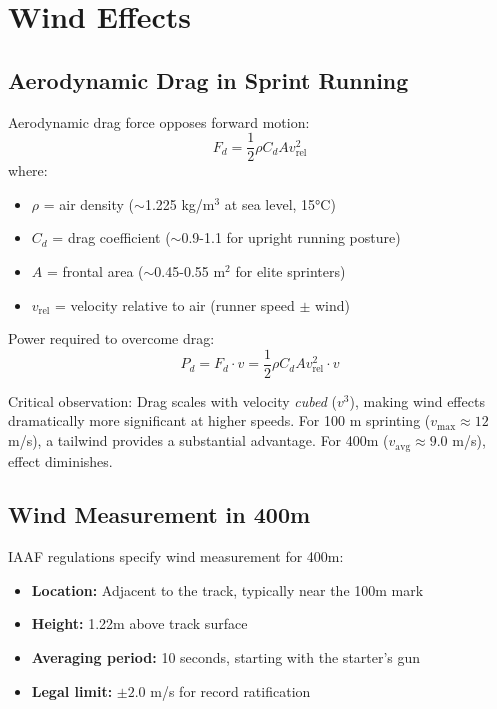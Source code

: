 \section{Wind Effects}

\subsection{Aerodynamic Drag in Sprint Running}

Aerodynamic drag force opposes forward motion:
\begin{equation}
F_d = \frac{1}{2} \rho C_d A v_{\text{rel}}^2
\end{equation}
where:
\begin{itemize}
    \item $\rho$ = air density ($\sim$1.225 kg/m$^3$ at sea level, 15°C)
    \item $C_d$ = drag coefficient ($\sim$0.9-1.1 for upright running posture)
    \item $A$ = frontal area ($\sim$0.45-0.55 m$^2$ for elite sprinters)
    \item $v_{\text{rel}}$ = velocity relative to air (runner speed $\pm$ wind)
\end{itemize}

Power required to overcome drag:
\begin{equation}
P_d = F_d \cdot v = \frac{1}{2} \rho C_d A v_{\text{rel}}^2 \cdot v
\end{equation}

Critical observation: Drag scales with velocity \textit{cubed} ($v^3$), making wind effects dramatically more significant at higher speeds. For 100 m sprinting ($v_{\max} \approx 12$ m/s), a tailwind provides a substantial advantage. For 400m ($v_{\text{avg}} \approx 9.0$ m/s), effect diminishes.

\subsection{Wind Measurement in 400m}

IAAF regulations specify wind measurement for 400m:
\begin{itemize}
    \item \textbf{Location:} Adjacent to the track, typically near the 100m mark
    \item \textbf{Height:} 1.22m above track surface
    \item \textbf{Averaging period:} 10 seconds, starting with the starter's gun
    \item \textbf{Legal limit:} $\pm 2.0$ m/s for record ratification
\end{itemize}

